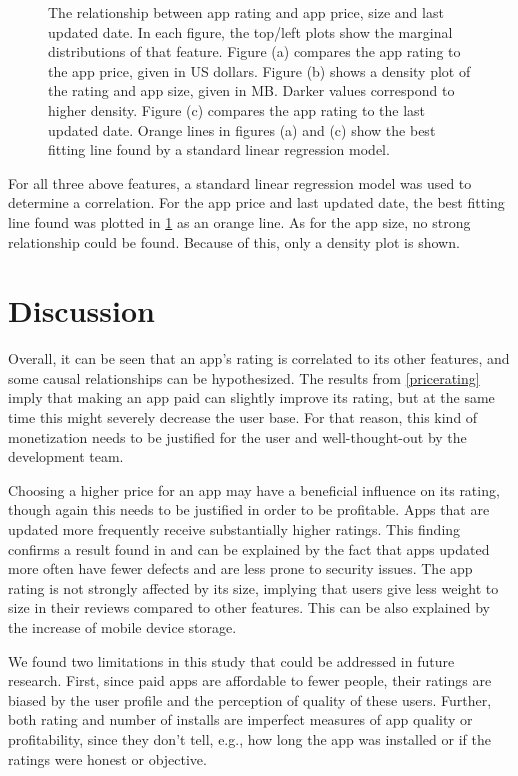 \documentclass{article}
\begin{document}
\begin{figure}[h]
\caption{The relationship between app rating and app price, size and last updated date. In each figure, the top/left plots show the marginal distributions of that feature. Figure (a) compares the app rating to the app price, given in US dollars. Figure (b) shows a density plot of the rating and app size, given in MB. Darker values correspond to higher density. Figure (c) compares the app rating to the last updated date. Orange lines in figures (a) and (c) show the best fitting line found by a standard linear regression model.}
\label{fig2} 
\end{figure}

For all three above features, a standard linear regression model was used to determine a correlation. For the app price and last updated date, the best fitting line found was plotted in \cref{fig2} as an orange line. As for the app size, no strong relationship could be found. Because of this, only a density plot is shown. 


\section{Discussion}

Overall, it can be seen that an app's rating is correlated to its other features, and some causal relationships can be hypothesized. The results from \cref{pricerating} imply that making an app paid can slightly improve its rating, but at the same time this might severely decrease the user base. For that reason, this kind of monetization needs to be justified for the user and well-thought-out by the development team.

Choosing a higher price for an app may have a beneficial influence on its rating, though again this needs to be justified in order to be profitable. Apps that are updated more frequently receive substantially higher ratings. This finding confirms a result found in \cite{freshapps} and can be explained by the fact that apps updated more often have fewer defects and are less prone to security issues. The app rating is not strongly affected by its size, implying that users give less weight to size in their reviews compared to other features. This can be also explained by the increase of mobile device storage.

We found two limitations in this study that could be addressed in future research. First, since paid apps are affordable to fewer people, their ratings are biased by the user profile and the perception of quality of these users. Further, both rating and number of installs are imperfect measures of app quality or profitability, since they don't tell, e.g., how long the app was installed or if the ratings were honest or objective.
\end{document}
